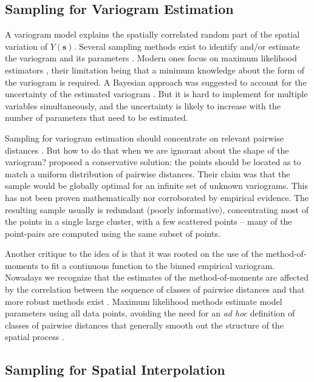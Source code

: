 \subsection{Sampling for Variogram Estimation}

A variogram model explains the spatially correlated random part of the spatial variation of 
$Y(\boldsymbol{s})$. Several sampling methods exist to identify and/or estimate the variogram and its 
parameters \cite{BrusEtAl1994, deGruijterEtAl2006, Mueller2007, WebsterEtAl2013}. Modern ones focus on maximum 
likelihood estimators \cite{Lark2002, Zimmerman2006, Mueller2007}, their limitation being that a minimum 
knowledge about the form of the variogram is required. A Bayesian approach was suggested to account for the 
uncertainty of the estimated variogram \cite{DiggleEtAl2006, MarchantEtAl2006, ZhuEtAl2006}. But it is hard to 
implement for multiple variables simultaneously, and the uncertainty is likely to increase with the number of 
parameters that need to be estimated.

Sampling for variogram estimation should concentrate on relevant pairwise distances \cite{MuellerEtAl1999, 
Lark2002}. But how to do that when we are ignorant about the shape of the variogram? \citet{BreslerEtAl1982, 
Russo1984, WarrickEtAl1987} proposed a conservative solution: the points should be located as to match a 
uniform distribution of pairwise distances. Their claim was that the sample would be globally optimal for an 
infinite set of unknown variograms. This has not been proven mathematically nor corroborated by empirical 
evidence. The resulting sample usually is redundant (poorly informative), concentrating most of the points in a
single large cluster, with a few scattered points -- many of the point-pairs are computed using the same subset
of points.

Another critique to the idea of \citet{BreslerEtAl1982, Russo1984, WarrickEtAl1987} is that it was rooted on 
the use of the method-of-moments to fit a continuous function to the binned empirical variogram. Nowadays we 
recognize that the estimates of the method-of-moments are affected by the correlation between the sequence of 
classes of pairwise distances and that more robust methods exist \cite{DiggleEtAl2002}. Maximum likelihood 
methods estimate model parameters using all data points, avoiding the need for an \textit{ad hoc} definition of
classes of pairwise distances that generally smooth out the structure of the spatial process  
\cite{Lark2000}.

\subsection{Sampling for Spatial Interpolation}

